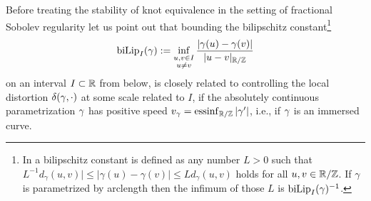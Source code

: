 
Before treating the stability of knot equivalence in the setting of
fractional Sobolev regularity let us point out that bounding  the
bilipschitz constant\footnote{\label{foot:bilip}In \cite{freedman-etal_1994} a bilipschitz constant
is defined as any number $L>0$ such that $L^{-1}d_\gamma(u,v)|\le|\gamma(u)-\gamma(v)|\le Ld_\gamma(u,v)$
holds for all $u,v\in\mathbb{R}/\mathbb{Z}$.
If $\gamma$ is parametrized by arclength then the infimum of those $L$
is $\operatorname{biLip}_I(\gamma)^{-1}$.}
\begin{equation}\label{eq:def-bilip}
\operatorname{biLip}_I(\gamma):=\inf_{\substack{u,v\in I\\u\ne v}}\frac{|\gamma(u)-\gamma(v)|}{|u-v|_{\mathbb{R}/\mathbb{Z}}}
\end{equation}
on an interval $I\subset\mathbb{R}$ from below, is closely related to
controlling the local distortion $\delta(\gamma,\cdot)$ at some
scale related to $I$, if the absolutely continuous parametrization $\gamma$
has positive
speed $v_\gamma=\operatorname{essinf}_{\mathbb{R}/\mathbb{Z}}|\gamma'|$, i.e., if $\gamma$ is an immersed curve.

